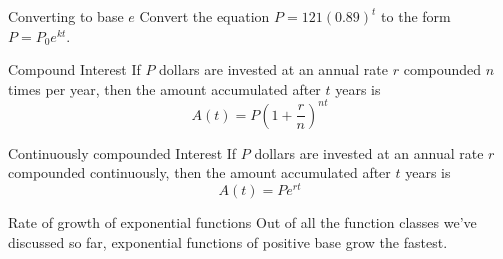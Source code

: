 \documentclass[t,handout]{beamer}
\begin{document}
\begin{frame}{Converting to base $e$}
Convert the equation $P = 121 (0.89)^t$ to the form $P = P_0 e^{kt}$.
\end{frame}

\begin{frame}{Compound Interest}
If $P$ dollars are invested at an annual rate $r$ compounded $n$ times per year, then the 
amount accumulated after $t$ years is
$$A(t) = P (1 + \frac{r}{n})^{nt}$$
\end{frame}

\begin{frame}{Continuously compounded Interest}
If $P$ dollars are invested at an annual rate $r$ compounded continuously, then the 
amount accumulated after $t$ years is
$$A(t) = P e^{rt}$$
\end{frame}


\begin{frame}{Rate of growth of exponential functions}
Out of all the function classes we've discussed so far, exponential functions of positive
base grow the fastest. 
\end{frame}
\end{document}
